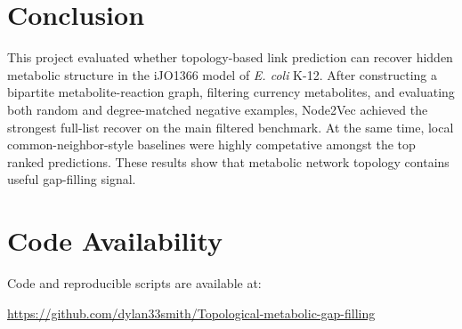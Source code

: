 \documentclass[reprint,preprintnumbers,amsmath,amssymb,aps,nofootinbib,showkeys]{revtex4-2}
\begin{document}
\section{Conclusion}

    This project evaluated whether topology-based link prediction can recover hidden metabolic structure in the iJO1366 model of \textit{E. coli} K-12. After constructing a bipartite metabolite-reaction graph, filtering currency metabolites, and evaluating both random and degree-matched negative examples, Node2Vec achieved the strongest full-list recover on the main filtered benchmark. At the same time, local common-neighbor-style baselines were highly competative amongst the top ranked predictions. These results show that metabolic network topology contains useful gap-filling signal. 


\section{Code Availability}

    Code and reproducible scripts are available at:

    \url{https://github.com/dylan33smith/Topological-metabolic-gap-filling}
\end{document}
